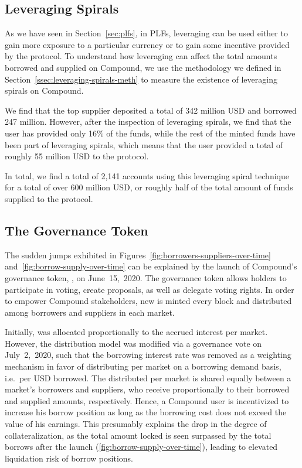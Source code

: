 \subsection{Leveraging Spirals}
As we have seen in Section~\ref{sec:plfs}, in PLFs, leveraging can be used either to gain more exposure to a particular currency or to gain some incentive provided by the protocol.
To understand how leveraging can affect the total amounts borrowed and supplied on Compound, we use the methodology we defined in Section~\ref{ssec:leveraging-spirals-meth} to measure the existence of leveraging spirals on Compound.

We find that the top supplier deposited a total of 342 million USD and borrowed 247 million.
However, after the inspection of leveraging spirals, we find that the user has provided only 16\% of the funds, while the rest of the minted funds have been part of leveraging spirals, which means that the user provided a total of roughly 55 million USD to the protocol.

In total, we find a total of 2,141 accounts using this leveraging spiral technique for a total of over 600 million USD, or roughly half of the total amount of funds supplied to the protocol.

\subsection{The  Governance Token}
The sudden jumps exhibited in Figures~\ref{fig:borrowers-suppliers-over-time} and~\ref{fig:borrow-supply-over-time} can be explained by the launch of Compound's governance token, , on June~15,~2020.
The  governance token allows holders to participate in voting, create proposals, as well as delegate voting rights.
In order to empower Compound stakeholders, new  is minted every block and distributed among borrowers and suppliers in each market.

Initially,  was allocated proportionally to the accrued interest per market.
However, the  distribution model was modified via a governance vote on July~2,~2020, such that the borrowing interest rate was removed as a weighting mechanism in favor of distributing  per market on a borrowing demand basis, i.e.\ per USD borrowed.
The distributed  per market is shared equally between a market's borrowers and suppliers, who receive  proportionally to their borrowed and supplied amounts, respectively.
Hence, a Compound user is incentivized to increase his borrow position as long as the borrowing cost does not exceed the value of his  earnings. This presumably explains the drop in the degree of collateralization, as the total amount locked is seen surpassed by the total borrows after the  launch (\autoref{fig:borrow-supply-over-time}), leading to elevated liquidation risk of borrow positions.


